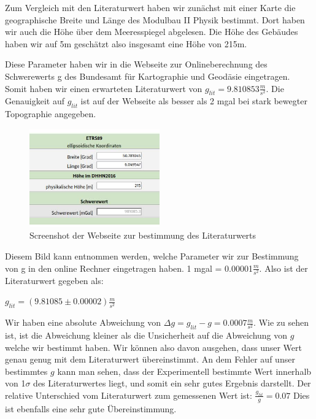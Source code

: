 \documentclass[twoside]{protokoll}
\begin{document}
Zum Vergleich mit den Literaturwert haben wir zunächst mit einer Karte die geographische Breite und Länge des Modulbau II Physik bestimmt.
Dort haben wir auch die Höhe über dem Meeresspiegel abgelesen. 
Die Höhe des Gebäudes haben wir auf 5m geschätzt also insgesamt eine Höhe von 215m.

Diese Parameter haben wir in die Webseite zur Onlineberechnung des Schwerewerts g des Bundesamt für Kartographie und Geodäsie eingetragen. 
Somit haben wir einen erwarteten Literaturwert von $g_{lit} = 9.810853 \frac{m}{s^2}$.
Die Genauigkeit auf $g_{lit}$ ist auf der Webseite als besser als 2 mgal bei stark bewegter Topographie angegeben.
\begin{figure}[H]
    \centering
    \includegraphics[width=0.5\textwidth]{Bilder/Screenshot_Literaturwert.png}
    \caption{Screenshot der Webseite zur bestimmung des Literaturwerts}
\end{figure}

Diesem Bild kann entnommen werden, welche Parameter wir zur Bestimmung von g in den online Rechner eingetragen haben.
1 mgal = 0.00001$\frac{m}{s^2}$. Also ist der Literaturwert gegeben als:
\begin{center}
    $g_{lit} = \left(9.81085 \pm 0.00002 \right)\frac{m}{s^2}$
\end{center}

Wir haben eine absolute Abweichung von $\Delta g = g_{lit} - g = 0.0007 \frac{m}{s^2}$.
Wie zu sehen ist, ist die Abweichung kleiner als die Unsicherheit auf die Abweichung von $g$ welche wir bestimmt haben.
Wir können also davon ausgehen, dass unser Wert genau genug mit dem Literaturwert übereinstimmt.
An dem Fehler auf unser bestimmtes $g$ kann man sehen, dass der Experimentell bestimmte Wert innerhalb von 1$\sigma$ des Literaturwertes liegt, und somit ein sehr gutes Ergebnis darstellt.
Der relative Unterschied vom Literaturwert zum gemessenen Wert ist: $\frac{g_{lit}}{g} =  0.07$ \textperthousand
Dies ist ebenfalls eine sehr gute Übereinstimmung.
\end{document}
